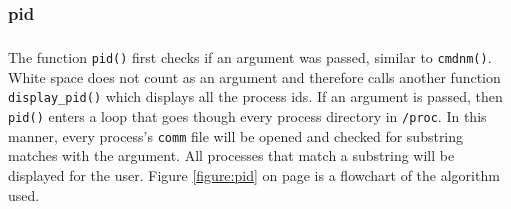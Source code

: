 \documentclass[10pt]{article}
\begin{document}
\subsubsection{pid}
\subparagraph{}
The function \texttt{pid()} first checks if an argument was passed, similar to \texttt{cmdnm()}. White space does not count as an argument and therefore calls another function \texttt{display\_pid()} which displays all the process ids. If an argument is passed, then \texttt{pid()} enters a loop that goes though every process directory in \texttt{/proc}. In this manner, every process's \texttt{comm} file will be opened and checked for substring matches with the argument. All processes that match a substring will be displayed for the user. Figure \ref{figure:pid} on page \pageref{figure:pid} is a flowchart of the algorithm used.
\end{document}
